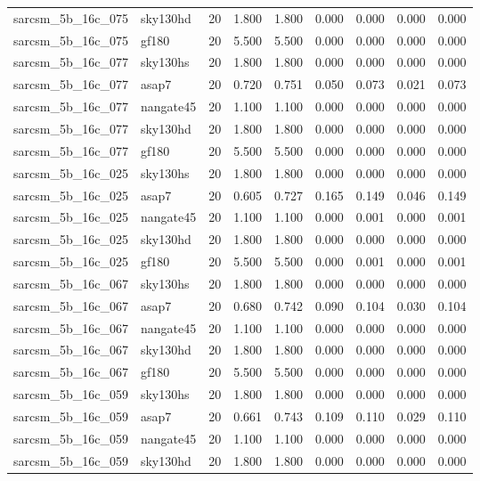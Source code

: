 \begin{tabular}{llrrrrrrr}
sarcsm\_5b\_16c\_075 & sky130hd & 20 & 1.800 & 1.800 & 0.000 & 0.000 & 0.000 & 0.000 \\
sarcsm\_5b\_16c\_075 & gf180 & 20 & 5.500 & 5.500 & 0.000 & 0.000 & 0.000 & 0.000 \\
sarcsm\_5b\_16c\_077 & sky130hs & 20 & 1.800 & 1.800 & 0.000 & 0.000 & 0.000 & 0.000 \\
sarcsm\_5b\_16c\_077 & asap7 & 20 & 0.720 & 0.751 & 0.050 & 0.073 & 0.021 & 0.073 \\
sarcsm\_5b\_16c\_077 & nangate45 & 20 & 1.100 & 1.100 & 0.000 & 0.000 & 0.000 & 0.000 \\
sarcsm\_5b\_16c\_077 & sky130hd & 20 & 1.800 & 1.800 & 0.000 & 0.000 & 0.000 & 0.000 \\
sarcsm\_5b\_16c\_077 & gf180 & 20 & 5.500 & 5.500 & 0.000 & 0.000 & 0.000 & 0.000 \\
sarcsm\_5b\_16c\_025 & sky130hs & 20 & 1.800 & 1.800 & 0.000 & 0.000 & 0.000 & 0.000 \\
sarcsm\_5b\_16c\_025 & asap7 & 20 & 0.605 & 0.727 & 0.165 & 0.149 & 0.046 & 0.149 \\
sarcsm\_5b\_16c\_025 & nangate45 & 20 & 1.100 & 1.100 & 0.000 & 0.001 & 0.000 & 0.001 \\
sarcsm\_5b\_16c\_025 & sky130hd & 20 & 1.800 & 1.800 & 0.000 & 0.000 & 0.000 & 0.000 \\
sarcsm\_5b\_16c\_025 & gf180 & 20 & 5.500 & 5.500 & 0.000 & 0.001 & 0.000 & 0.001 \\
sarcsm\_5b\_16c\_067 & sky130hs & 20 & 1.800 & 1.800 & 0.000 & 0.000 & 0.000 & 0.000 \\
sarcsm\_5b\_16c\_067 & asap7 & 20 & 0.680 & 0.742 & 0.090 & 0.104 & 0.030 & 0.104 \\
sarcsm\_5b\_16c\_067 & nangate45 & 20 & 1.100 & 1.100 & 0.000 & 0.000 & 0.000 & 0.000 \\
sarcsm\_5b\_16c\_067 & sky130hd & 20 & 1.800 & 1.800 & 0.000 & 0.000 & 0.000 & 0.000 \\
sarcsm\_5b\_16c\_067 & gf180 & 20 & 5.500 & 5.500 & 0.000 & 0.000 & 0.000 & 0.000 \\
sarcsm\_5b\_16c\_059 & sky130hs & 20 & 1.800 & 1.800 & 0.000 & 0.000 & 0.000 & 0.000 \\
sarcsm\_5b\_16c\_059 & asap7 & 20 & 0.661 & 0.743 & 0.109 & 0.110 & 0.029 & 0.110 \\
sarcsm\_5b\_16c\_059 & nangate45 & 20 & 1.100 & 1.100 & 0.000 & 0.000 & 0.000 & 0.000 \\
sarcsm\_5b\_16c\_059 & sky130hd & 20 & 1.800 & 1.800 & 0.000 & 0.000 & 0.000 & 0.000 \\

\end{tabular}
